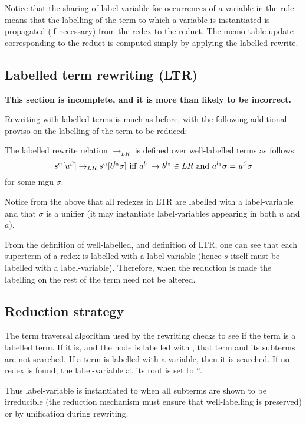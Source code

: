 Notice that the sharing of label-variable for occurrences of a
variable in the rule means that the labelling of the term to which a
variable is instantiated is propagated (if necessary) from the redex to the
reduct. The memo-table update corresponding to the reduct is computed
simply by applying the labelled rewrite.

\subsection {Labelled term rewriting (LTR)}
{\bf This section is incomplete, and it is more than likely to be
incorrect.}

Rewriting with labelled terms is much as before, with the following
additional proviso on the labelling of the term to be reduced:

\begin{defn}
The labelled rewrite relation $\rightarrow_{LR}$ is defined over
well-labelled terms as follows:
\[
s^\alpha[u^\beta]\rightarrow_{LR} s^\alpha[\tc{l_2}b\sigma]\mbox{ iff }
		a^{l_1}\rightarrow \tc{l_2}b\in LR \mbox{ and } a^{l_1}\sigma=u^\beta\sigma
\] 
for some mgu $\sigma$.
\end{defn}
Notice from the above that all redexes in LTR are labelled with a
label-variable and that $\sigma$ is a unifier (it may instantiate
label-variables appearing in both $u$ and $a$).

From the definition of well-labelled, and definition of LTR, one can
see that each superterm of a redex is labelled with a label-variable
(hence $s$ itself must be labelled with a label-variable).  Therefore,
when the reduction is made the labelling on the rest of the term need
not be altered.

\subsection {Reduction strategy}
The term traversal algorithm used by the rewriting checks to see if
the term is a labelled term. If it is, and the node is labelled with
\nf, that term and its subterms are not searched.  If a term is
labelled with a variable, then it is searched.  If no redex is found,
the label-variable at its root is set to `\nf'.  

Thus label-variable is instantiated to \nf{} when all subterms are
shown to be irreducible (the reduction mechanism must ensure that
well-labelling is preserved) or by unification during rewriting.


